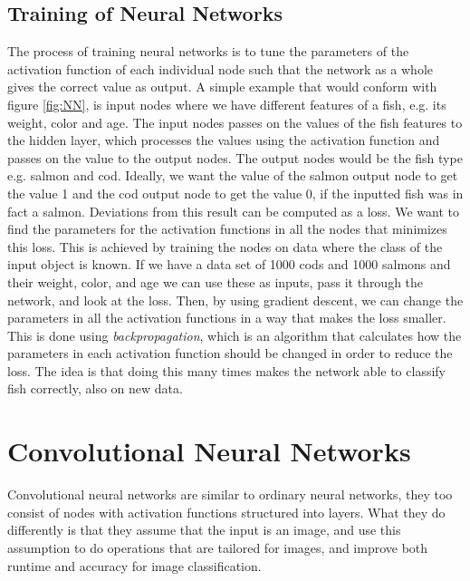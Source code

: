 \newpage

\subsection{Training of Neural Networks}
\label{sec:training}
The process of training neural networks is to tune the parameters of the activation function of each individual node such that the network as a whole gives the correct value as output. A simple example that would conform with figure \ref{fig:NN}, is input nodes where we have different features of a fish, e.g. its weight, color and age. The input nodes passes on the values of the fish features to the hidden layer, which processes the values using the activation function and passes on the value to the output nodes. The output nodes would be the fish type e.g. salmon and cod. Ideally, we want the value of the salmon output node to get the value 1 and the cod output node to get the value 0, if the inputted fish was in fact a salmon. Deviations from this result can be computed as a loss. We want to find the parameters for the activation functions in all the nodes that minimizes this loss. This is achieved by training the nodes on data where the class of the input object is known. If we have a data set of 1000 cods and 1000 salmons and their weight, color, and age we can use these as inputs, pass it through the network, and look at the loss. Then, by using gradient descent, we can change the parameters in all the activation functions in a way that makes the loss smaller. This is done using \textit{backpropagation}, which is an algorithm that calculates how the parameters in each activation function should be changed in order to reduce the loss. The idea is that doing this many times makes the network able to classify fish correctly, also on new data. 


\section{Convolutional Neural Networks}

Convolutional neural networks are similar to ordinary neural networks, they too consist of nodes with activation functions structured into layers. What they do differently is that they assume that the input is an image, and use this assumption to do operations that are tailored for images, and improve both runtime and accuracy for image classification. 

